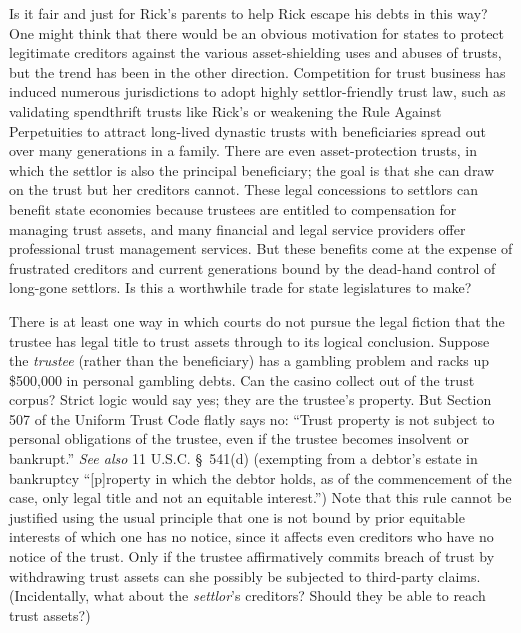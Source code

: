 Is it fair and just for Rick's parents to help Rick escape his debts in this
way? One might think that there would be an obvious motivation for states to
protect legitimate creditors against the various asset-shielding uses and abuses
of trusts, but the trend has been in the other direction. Competition for trust
business has induced numerous jurisdictions to adopt highly settlor-friendly
trust law, such as validating spendthrift trusts like Rick's or weakening the
Rule Against Perpetuities to attract long-lived dynastic trusts with
beneficiaries spread out over many generations in a family. There are even
asset-protection trusts, in which the settlor is also the principal beneficiary;
the goal is that she can draw on the trust but her creditors cannot. These legal
concessions to settlors can benefit state economies because trustees are
entitled to compensation for managing trust assets, and many financial and legal
service providers offer professional trust management services. But these
benefits come at the expense of frustrated creditors and current generations
bound by the dead-hand control of long-gone settlors. Is this a worthwhile trade
for state legislatures to make?


\item There is at least one way in which courts do not pursue the legal fiction
that the trustee has legal title to trust assets through to its logical
conclusion. Suppose the \textit{trustee} (rather than the beneficiary) has a
gambling problem and racks up \$500,000 in personal gambling debts. Can the
casino collect out of the trust corpus? Strict logic would say yes; they are the
trustee's property. But Section 507 of the Uniform Trust Code flatly says no:
``Trust property is not subject to personal obligations of the trustee, even if
the trustee becomes insolvent or bankrupt.'' \textit{See also} 11 U.S.C.
\S~541(d) (exempting from a debtor's estate in bankruptcy ``[p]roperty in which
the debtor holds, as of the commencement of the case, only legal title and not
an equitable interest.'') Note that this rule cannot be justified using the
usual principle that one is not bound by prior equitable interests of which one
has no notice, since it affects even creditors who have no notice of the trust.
Only if the trustee affirmatively commits breach of trust by withdrawing trust
assets can she possibly be subjected to third-party claims. (Incidentally, what
about the \textit{settlor}'s creditors? Should they be able to reach trust
assets?)

